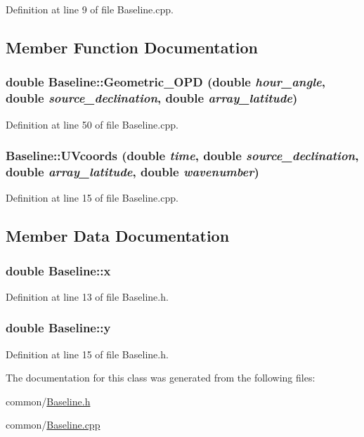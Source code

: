 Definition at line 9 of file Baseline.cpp.



\subsection{Member Function Documentation}
\hypertarget{classBaseline_ae587b0cb5079c4fc80c51e057427cb8f}{
\subsubsection[{Geometric\_\-OPD}]{\setlength{\rightskip}{0pt plus 5cm}double Baseline::Geometric\_\-OPD (double {\em hour\_\-angle}, \/  double {\em source\_\-declination}, \/  double {\em array\_\-latitude})}}
\label{classBaseline_ae587b0cb5079c4fc80c51e057427cb8f}


Definition at line 50 of file Baseline.cpp.

\hypertarget{classBaseline_a30f26555e34ed66db0ac34a79da505bb}{
\subsubsection[{UVcoords}]{ Baseline::UVcoords (double {\em time}, \/  double {\em source\_\-declination}, \/  double {\em array\_\-latitude}, \/  double {\em wavenumber})}}
\label{classBaseline_a30f26555e34ed66db0ac34a79da505bb}


Definition at line 15 of file Baseline.cpp.



\subsection{Member Data Documentation}
\hypertarget{classBaseline_a021810b132f5d98736d71b92b5f70e36}{
\subsubsection[{x}]{\setlength{\rightskip}{0pt plus 5cm}double {\bf Baseline::x}}}
\label{classBaseline_a021810b132f5d98736d71b92b5f70e36}


Definition at line 13 of file Baseline.h.

\hypertarget{classBaseline_a2ffd76cdea353462b6529ec4e9b425b2}{
\subsubsection[{y}]{\setlength{\rightskip}{0pt plus 5cm}double {\bf Baseline::y}}}
\label{classBaseline_a2ffd76cdea353462b6529ec4e9b425b2}


Definition at line 15 of file Baseline.h.



The documentation for this class was generated from the following files:\begin{DoxyCompactItemize}
\item 
common/\hyperlink{Baseline_8h}{Baseline.h}\item 
common/\hyperlink{Baseline_8cpp}{Baseline.cpp}\end{DoxyCompactItemize}
